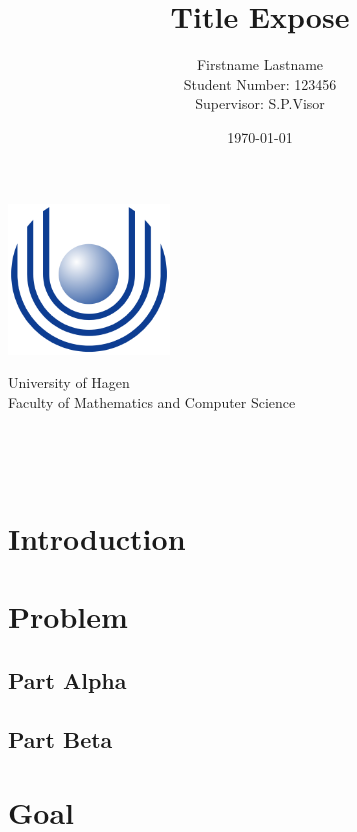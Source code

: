 \documentclass[letterpaper,oneside,11pt]{article}
\title{Title Expose}
\author{
    Firstname Lastname\\
    {\small Student Number: 123456}\\
    [1cm]{\small Supervisor: S.P.Visor}
}
\date{\today}
\begin{document}
\begin{titlingpage} %
\begin{center}
\includegraphics[height=4cm]{images/Uni_hagen_logo}\\ %
\begin{large}
University of Hagen \\ %
Faculty of Mathematics and Computer Science\\
\end{large}
\vspace{4cm} %
\begin{large} 
\textbf{\thetitle} \\
\end{large}
\theauthor\\
\vspace{7cm} %
\thedate
\end{center}
\end{titlingpage}

\section{Introduction}


\section{Problem}

\subsection{Part Alpha}

\subsection{Part Beta}


\section{Goal}
\end{document}
